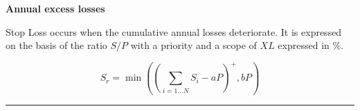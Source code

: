\begin{f}
	
	
	
	



\textbf{Annual excess losses}
	
	
Stop Loss occurs when the cumulative annual losses deteriorate.
It is expressed on the basis of the ratio $S/P$ with a priority and a scope of $XL$ expressed in \%.
	
$$
S_r= \min\left( \left( \sum_{i=1\ldots N} S_i - a  P\right)^+,bP\right)  
$$

\end{f}
\hrule
	
